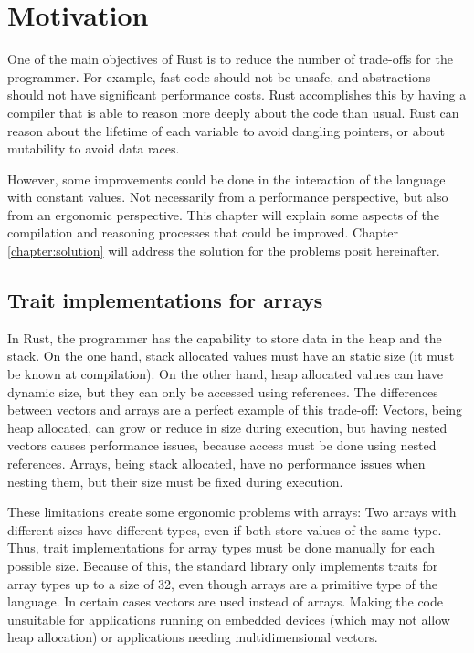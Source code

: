 \chapter{Motivation}
One of the main objectives of Rust is to reduce the number of trade-offs for
the programmer. For example, fast code should not be unsafe, and abstractions
should not have significant performance costs. Rust accomplishes this by having
a compiler that is able to reason more deeply about the code than usual. Rust
can reason about the lifetime of each variable to avoid dangling pointers, or
about mutability to avoid data races. 

However, some improvements could be done in the interaction of the language
with constant values. Not necessarily from a performance perspective, but also
from an ergonomic perspective. This chapter will explain some aspects of the
compilation and reasoning processes that could be improved. Chapter
\ref{chapter:solution} will address the solution for the problems
posit hereinafter.

\label{chapter:motivation}
\section{Trait implementations for arrays}
In Rust, the programmer has the capability to store data in the heap and the
stack. On the one hand, stack allocated values must have an static size (it
must be known at compilation). On the other hand, heap allocated values can
have dynamic size, but they can only be accessed using references. The
differences between vectors and arrays are a perfect example of this trade-off:
Vectors, being heap allocated, can grow or reduce in size during execution, but
having nested vectors causes performance issues, because access must be done
using nested references. Arrays, being stack allocated, have no performance
issues when nesting them, but their size must be fixed during execution.

These limitations create some ergonomic problems with arrays: Two arrays with
different sizes have different types, even if both store values of the same
type. Thus, trait implementations for array types must be done manually for
each possible size. Because of this, the standard library only implements
traits for array types up to a size of 32, even though arrays are a primitive
type of the language. In certain cases vectors are used instead of arrays.
Making the code unsuitable for applications running on embedded devices (which
may not allow heap allocation) or applications needing multidimensional
vectors.

